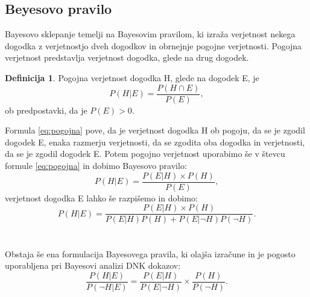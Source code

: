 \documentclass[12pt,a4paper]{amsart}
\theoremstyle{definition} %
\newtheorem{definicija}{Definicija}[section]
\theoremstyle{plain} %
\begin{document}
\subsection{Beyesovo pravilo}
Bayesovo sklepanje temelji na Bayesovim pravilom, ki izraža verjetnost nekega dogodka z verjetnostjo dveh dogodkov in obrnejnje pogojne 
verjetnosti. Pogojna verjetnost predstavlja verjetnost dogodka, glede na drug dogodek.

\begin{definicija}
    Pogojna verjetnost dogodka H, glede na dogodek E, je
    \begin{equation}\label{eq:pogojna}
    P(H \lvert E) = \frac{P(H \cap E)}{P(E)},
    \end{equation}
    ob predpostavki, da je $P(E) > 0$.
\end{definicija}
    
Formula \eqref{eq:pogojna} pove, da je verjetnost dogodka H ob pogoju, da se je zgodil dogodek E, enaka razmerju verjetnosti, da se 
zgodita oba dogodka in verjetnosti, da se je zgodil dogodek E.
Potem pogojno verjetnost uporabimo še v števcu formule \eqref{eq:pogojna} in dobimo Bayesovo pravilo:
\begin{equation}\label{eq:bpravilo}
    P(H \lvert E) = \frac{P(E \lvert H) \times P(H)}{P(E)},
\end{equation}   
verjetnost dogodka E lahko še razpišemo in dobimo:
\begin{equation}\label{eq:b_pravilo}
    P(H \lvert E) = \frac{P(E \lvert H) \times P(H)}{P(E \lvert H)P(H) + P(E \lvert \neg H)P(\neg H)}.
\end{equation} \\\\
Obstaja še ena formulacija Bayesovega pravila, ki olajša izračune in je pogosto uporabljena pri Bayesovi analizi DNK dokazov:
\begin{equation}\label{eq:b_pravilo_DNK}
    \frac{P(H \lvert E)}{P(\neg H \lvert E)} = \frac{P(E \lvert H)}{P(E \lvert \neg H)} \times \frac{P(H)}{P(\neg H)}.
\end{equation}

\end{document}
